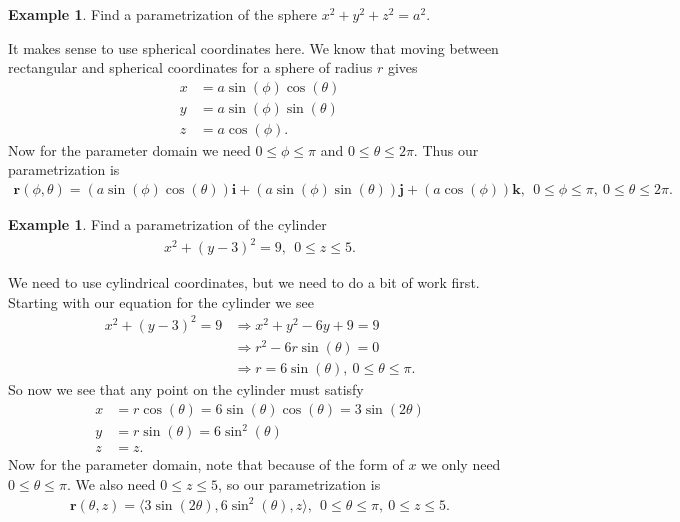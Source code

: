 \documentclass[12pt, letter]{article}
\theoremstyle{plain}
\numberwithin{theorem}{section}
\theoremstyle{definition}
\newtheorem{example}[theorem]{Example}
\begin{document}
\bigskip

\hrulefill

\bigskip

\begin{example}
Find a parametrization of the sphere $x^2+y^2+z^2=a^2$.

\bigskip

It makes sense to use spherical coordinates here. We know that moving between rectangular and spherical coordinates for a sphere of radius $r$ gives
\begin{align*}
x&=a\sin(\phi)\cos(\theta)\\
y&=a\sin(\phi)\sin(\theta)\\
z&=a\cos(\phi).
\end{align*}
Now for the parameter domain we need $0\leq \phi \leq \pi$ and $0\leq \theta \leq 2\pi$. Thus our parametrization is
\begin{align*}
\bm{r}(\phi,\theta) = (a\sin(\phi)\cos(\theta))\bm{i}+(a\sin(\phi)\sin(\theta))\bm{j}+(a\cos(\phi))\bm{k}, \ \ 0\leq \phi \leq \pi, \ 0\leq \theta \leq 2\pi.
\end{align*}
\end{example}

\bigskip

\hrulefill

\bigskip

\begin{example}
Find a parametrization of the cylinder
\begin{align*}
x^2+(y-3)^2=9, \ \ 0\leq z \leq 5.
\end{align*}

\bigskip

We need to use cylindrical coordinates, but we need to do a bit of work first. Starting with our equation for the cylinder we see
\begin{align*}
x^2+(y-3)^2=9 &\Rightarrow x^2+y^2-6y+9=9\\
&\Rightarrow r^2-6r\sin(\theta)=0\\
&\Rightarrow r=6\sin(\theta), \ 0\leq \theta \leq \pi.
\end{align*}
So now we see that any point on the cylinder must satisfy
\begin{align*}
x&=r\cos(\theta)=6\sin(\theta)\cos(\theta)=3\sin(2\theta)\\
y&=r\sin(\theta)=6\sin^2(\theta)\\
z&=z.
\end{align*}
Now for the parameter domain, note that because of the form of $x$ we only need $0\leq \theta \leq \pi$. We also need $0\leq z\leq 5$, so our parametrization is
\begin{align*}
\bm{r}(\theta,z) = \langle 3\sin(2\theta), 6\sin^2(\theta), z \rangle, \ \ 0\leq \theta \leq \pi, \ 0\leq z \leq 5.
\end{align*}
\end{example}
\end{document}
